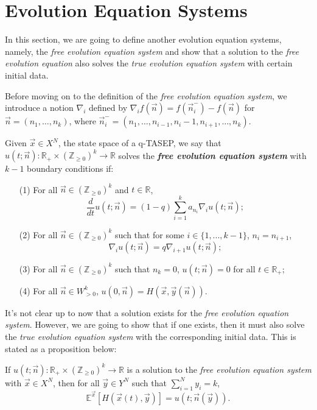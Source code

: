 \section{Evolution Equation Systems}
\label{evolution-equation-system}
In this section, we are going to define another evolution equation systems, namely, the \emph{free evolution equation system} and show that a solution to the \emph{free evolution equation} also solves the \emph{true evolution equation system} with certain initial data.

Before moving on to the definition of the \emph{free evolution equation system}, we introduce a notion $\nabla_i$ defined by $\nabla_i f(\vec{n}) = f(\vec{n}_i^-) - f(\vec{n})$ for $\vec{n} = (n_1, \dots, n_k)$, where $\vec{n}_i^- = (n_1,\dots,n_{i-1}, n_i - 1, n_{i+1}, \dots, n_k)$.

\begin{definition}
\label{def:free-evolution-equation}
Given $\vec{x} \in X^N$, the state space of a q-TASEP, we say that $u(t;\vec{n}):\mathbb{R}_+ \times (\mathbb{Z}_{\ge 0})^k \rightarrow \mathbb{R}$ solves the \textbf{\emph{free evolution equation system}} with $k-1$ boundary conditions if:
\begin{enumerate}
\item[(1)] For all $\vec{n} \in (\mathbb{Z}_{\ge 0})^k$ and $t \in \mathbb{R}$, $$\frac{d}{dt} u(t;\vec{n}) = (1-q) \sum_{i=1}^{k} a_{n_i} \nabla_i u(t;\vec{n});$$
\item[(2)] For all $\vec{n} \in (\mathbb{Z}_{\ge 0})^k$ such that for some $i \in \{1,...,k-1\}$, $n_i = n_{i+1}$, $$\nabla_i u(t;\vec{n}) = q \nabla_{i+1} u(t;\vec{n});$$
\item[(3)] For all $\vec{n} \in (\mathbb{Z}_{\ge 0})^k$ such that $n_k = 0$, $u(t;\vec{n}) = 0$ for all $t \in \mathbb{R}_+$;
\item[(4)] For all $\vec{n} \in W^k_{>0}$, $u(0,\vec{n}) = H(\vec{x},\vec{y}(\vec{n}))$. 
\end{enumerate}
\end{definition}

It's not clear up to now that a solution exists for the \emph{free evolution equation system}. However, we are going to show that if one exists, then it must also solve the \emph{true evolution equation system} with the corresponding initial data. This is stated as a proposition below:

\begin{proposition}
\label{free-to-true-evolution}
If $u(t;\vec{n}):\mathbb{R}_+ \times (\mathbb{Z}_{\ge 0})^k \rightarrow \mathbb{R}$ is a solution to the \emph{free evolution equation system} with $\vec{x} \in X^N$, then for all $\vec{y} \in Y^N$ such that $\sum_{i=1}^{N} y_i = k$, $$\mathbb{E}^{\vec{x}}[H(\vec{x}(t), \vec{y})] = u(t;\vec{n}(\vec{y})).$$
\end{proposition}

